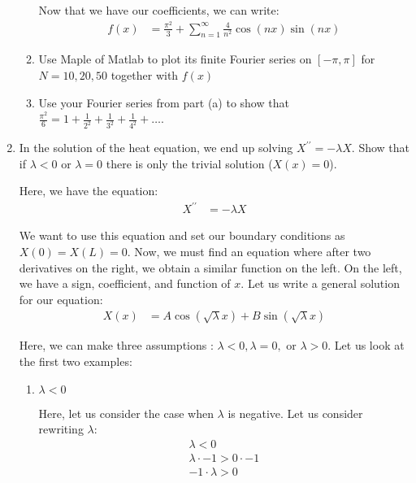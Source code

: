 \documentclass{article}
\begin{document}
\begin{enumerate}
\begin{enumerate}
    Now that we have our coefficients, we can write:
    \begin{align}
      f(x) & = \frac{\pi^2}{3} + \sum^\infty_{n = 1} \frac{4}{n^2} \cos(n x) \sin(n x)
    \end{align}
    \item Use Maple of Matlab to plot its finite Fourier series on $[-\pi, \pi]$ for $N = 10, 20, 50$ together with $f(x)$


    \item Use your Fourier series from part (a) to show that $\frac{\pi^2}{6} = 1 + \frac{1}{2^2} + \frac{1}{3^2} + \frac{1}{4^2} + \ldots$.


  \end{enumerate}
%
%
\newpage
%
%
  \item In the solution of the heat equation, we end up solving $X^{\prime\prime} = -\lambda X$. Show that if $\lambda < 0$ or $\lambda = 0$ there is only the trivial solution ($X(x) = 0$).

Here, we have the equation:
\begin{align}
  X^{\prime\prime} & = - \lambda X
\end{align}

We want to use this equation and set our boundary conditions as $X(0) = X(L) = 0$. Now, we must find an equation where after two derivatives on the right, we obtain a similar function on the left. On the left, we have a sign, coefficient, and function of $x$. Let us write a general solution for our equation:
%
\begin{align}
  X(x) & = A \cos(\sqrt \lambda x) + B \sin( \sqrt \lambda x)
\end{align}

Here, we can make three assumptions : $\lambda < 0, \lambda = 0,$ or $\lambda > 0$. Let us look at the first two examples:

\begin{enumerate}
  \item $\lambda < 0$

  Here, let us consider the case when $\lambda$ is negative. Let us consider rewriting $\lambda$:
  \begin{align}
    \lambda < 0\\
    \lambda \cdot -1 > 0 \cdot -1\\
    -1 \cdot \lambda > 0
  \end{align}


\end{enumerate}
\end{enumerate}
\end{document}

